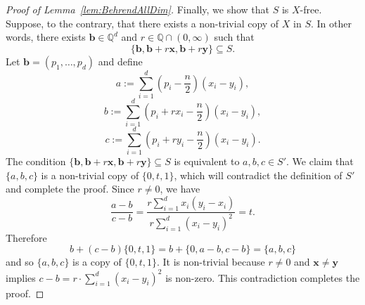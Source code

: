 \documentclass[12pt]{article}
\numberwithin{equation}{section}
\theoremstyle{definition}
\theoremstyle{remark}
\renewcommand{\vec}{\boldsymbol}
\begin{document}
\begin{proof}[Proof of Lemma~\ref{lem:BehrendAllDim}]
Finally, we show that $S$ is $X$-free. Suppose, to the contrary, that there exists a non-trivial copy of $X$ in $S$. In other words, there exists $\vec{b}\in \mathbb{Q}^d$ and $r\in \mathbb{Q}\cap (0,\infty)$ such that
\[\{\vec{b}, \vec{b}+r \vec{x}, \vec{b}+r\vec{y}\}\subseteq S.\]
Let $\vec{b}=(p_1,\dots,p_d)$ and define
\[a:=\sum_{i=1}^d \left(p_i-\frac{n}{2}\right)(x_i-y_i),\]
\[b:=\sum_{i=1}^d \left(p_i +rx_i-\frac{n}{2}\right)(x_i-y_i),\]
\[c:=\sum_{i=1}^d \left(p_i+ry_i-\frac{n}{2}\right)(x_i-y_i).\]
The condition $\{\vec{b}, \vec{b}+r \vec{x}, \vec{b}+r\vec{y}\}\subseteq S$ is equivalent to $a,b,c\in S'$. We claim that $\{a,b,c\}$ is a non-trivial copy of $\{0,t,1\}$, which will contradict the definition of $S'$ and complete the proof. Since $r\neq0$, we have
\[\frac{a-b}{c-b} = \frac{r\sum_{i=1}^dx_i(y_i-x_i)}{r\sum_{i=1}^d(x_i-y_i)^2} =t.\]
Therefore
\[ b + (c-b) \{0,t,1\} = b + \{0,a-b,c-b\} =  \{a,b,c\}\]
and so $\{a,b,c\}$ is a copy of $\{0,t,1\}$. It is non-trivial because $r\neq 0$ and $\vec{x}\neq\vec{y}$ implies $c-b=r\cdot\sum_{i=1}^d(x_i-y_i)^2$ is non-zero. This contradiction completes the proof. 
\end{proof}
\end{document}
